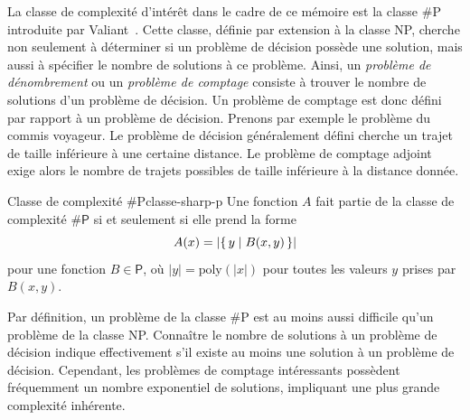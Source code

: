 La classe de complexité d'intérêt dans le cadre de ce mémoire est la classe \textsf{\#P} introduite par Valiant~\cite{valiantComplexityComputingPermanent1979}. Cette classe, définie par extension à la classe \textsf{NP}, cherche non seulement à déterminer si un problème de décision possède une solution, mais aussi à spécifier le nombre de solutions à ce problème. Ainsi, un \textit{problème de dénombrement} ou un \textit{problème de comptage} consiste à trouver le nombre de solutions d'un problème de décision. Un problème de comptage est donc défini par rapport à un problème de décision. Prenons par exemple le problème du commis voyageur. Le problème de décision généralement défini cherche un trajet de taille inférieure à une certaine distance. Le problème de comptage adjoint exige alors le nombre de trajets possibles de taille inférieure à la distance donnée. 

\begin{maindefinition}{Classe de complexité \textsf{\#P}}{classe-sharp-p}
    Une fonction $A$ fait partie de la classe de complexité $\textsf{\#P}$ si et seulement si elle prend la forme
    \begin{equation*}
        A(x) = \lvert \set{ y \mid B(x, y)} \rvert
    \end{equation*}
    pour une fonction $B \in \textsf{P}$, où $\lvert y \rvert = \mathrm{poly}(\lvert x \rvert)$ pour toutes les valeurs $y$ prises par $B(x,y)$.
\end{maindefinition}

Par définition, un problème de la classe \textsf{\#P} est au moins aussi difficile qu'un problème de la classe \textsf{NP}. Connaître le nombre de solutions à un problème de décision indique effectivement s'il existe au moins une solution à un problème de décision. Cependant, les problèmes de comptage intéressants possèdent fréquemment un nombre exponentiel de solutions, impliquant une plus grande complexité inhérente.

